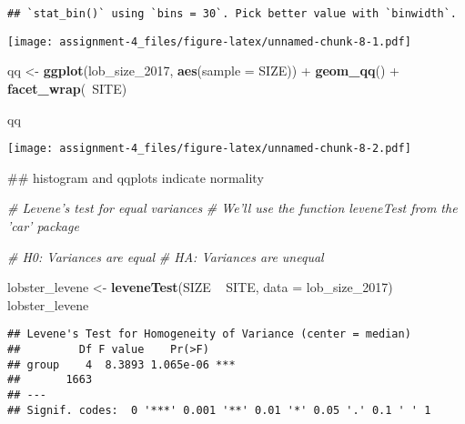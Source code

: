 \documentclass[]{article}
\newenvironment{Shaded}{\begin{snugshade}}{\end{snugshade}}
\newcommand{\KeywordTok}[1]{\textcolor[rgb]{0.13,0.29,0.53}{\textbf{{#1}}}}
\newcommand{\DataTypeTok}[1]{\textcolor[rgb]{0.13,0.29,0.53}{{#1}}}
\newcommand{\StringTok}[1]{\textcolor[rgb]{0.31,0.60,0.02}{{#1}}}
\newcommand{\CommentTok}[1]{\textcolor[rgb]{0.56,0.35,0.01}{\textit{{#1}}}}
\newcommand{\NormalTok}[1]{{#1}}
\begin{document}
\begin{verbatim}
## `stat_bin()` using `bins = 30`. Pick better value with `binwidth`.
\end{verbatim}

\texttt{[image: assignment-4\_files/figure-latex/unnamed-chunk-8-1.pdf]}

\begin{Shaded}
\begin{Highlighting}[]
\NormalTok{qq <-}\StringTok{ }\KeywordTok{ggplot}\NormalTok{(lob_size_2017, }\KeywordTok{aes}\NormalTok{(}\DataTypeTok{sample =} \NormalTok{SIZE)) +}
\StringTok{  }\KeywordTok{geom_qq}\NormalTok{() +}
\StringTok{  }\KeywordTok{facet_wrap}\NormalTok{(~SITE)}

\NormalTok{qq}
\end{Highlighting}
\end{Shaded}

\texttt{[image: assignment-4\_files/figure-latex/unnamed-chunk-8-2.pdf]}

\begin{Shaded}
\begin{Highlighting}[]
\NormalTok{## histogram and qqplots indicate normality}

\CommentTok{# Levene's test for equal variances }
\CommentTok{# We'll use the function leveneTest from the 'car' package}

\CommentTok{# H0: Variances are equal}
\CommentTok{# HA: Variances are unequal}

\NormalTok{lobster_levene <-}\StringTok{ }\KeywordTok{leveneTest}\NormalTok{(SIZE ~}\StringTok{ }\NormalTok{SITE, }\DataTypeTok{data =} \NormalTok{lob_size_2017)}
\NormalTok{lobster_levene}
\end{Highlighting}
\end{Shaded}

\begin{verbatim}
## Levene's Test for Homogeneity of Variance (center = median)
##         Df F value    Pr(>F)    
## group    4  8.3893 1.065e-06 ***
##       1663                      
## ---
## Signif. codes:  0 '***' 0.001 '**' 0.01 '*' 0.05 '.' 0.1 ' ' 1
\end{verbatim}

\begin{Shaded}
\end{Shaded}
\end{document}
